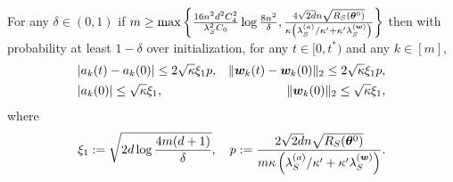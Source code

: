 \documentclass{article}
\begin{document}
\begin{prop}\label{prop:a_w}
    For any $\delta\in(0,1)$ if $m\geq\max\left\{\frac{16n^2d^2C_4^2}{\lambda_S^2C_0}\log\frac{8n^2}{\delta}, \frac{4\sqrt{2d}n\sqrt{R_S(\bm{\theta}^0)}}{\kappa\left(\lambda_S^{(a)}/\kappa'+\kappa'\lambda_S^{(\bm{w})}\right)}\right\}$ then with probability at least $1-\delta$ over initialization, for any $t\in[0, t^\ast)$ and any $k\in [m]$,
    \begin{equation}
        \begin{aligned}
             & |a_k(t) - a_k(0)| \leq 2\sqrt{\kappa}\xi_1 p, & \lVert\bm{w}_k(t) - \bm{w}_k(0)\rVert_2 \leq 2\sqrt{\kappa}\xi_1 p, \\
             & |a_k(0)| \leq \sqrt{\kappa}\xi_1, \quad       & \lVert\bm{w}_k(0)\rVert_2\leq\sqrt{\kappa}\xi_1,
        \end{aligned}
    \end{equation}
    where
    \begin{equation}
        \xi_1:=\sqrt{2d\log\frac{4m(d+1)}{\delta}},\quad p:=\frac{2\sqrt{2d}n\sqrt{R_S(\bm{\theta}^0)}}{m\kappa\left(\lambda_S^{(a)}/\kappa'+\kappa'\lambda_S^{(\bm{w})}\right)}.
    \end{equation}
\end{prop}
\end{document}
